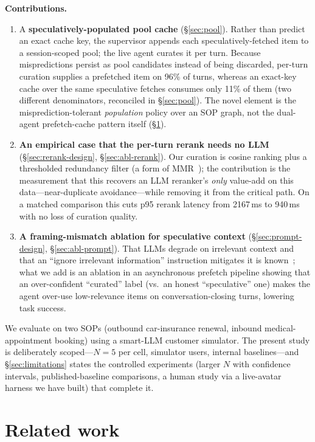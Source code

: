 \documentclass[10pt,twocolumn]{article}
\begin{document}
\textbf{Contributions.}
\begin{enumerate}[leftmargin=*, itemsep=3pt]
\item A \textbf{speculatively-populated pool cache} (\S\ref{sec:pool}). Rather than predict an exact cache key, the supervisor appends each speculatively-fetched item to a session-scoped pool; the live agent curates it per turn. Because mispredictions persist as pool candidates instead of being discarded, per-turn curation supplies a prefetched item on 96\% of turns, whereas an exact-key cache over the same speculative fetches consumes only 11\% of them (two different denominators, reconciled in \S\ref{sec:pool}). The novel element is the misprediction-tolerant \emph{population} policy over an SOP graph, not the dual-agent prefetch-cache pattern itself (\S\ref{sec:related}).
\item \textbf{An empirical case that the per-turn rerank needs no LLM} (\S\ref{sec:rerank-design}, \S\ref{sec:abl-rerank}). Our curation is cosine ranking plus a thresholded redundancy filter (a form of MMR~\cite{mmr1998}); the contribution is the measurement that this recovers an LLM reranker's \emph{only} value-add on this data---near-duplicate avoidance---while removing it from the critical path. On a matched comparison this cuts p95 rerank latency from 2167\,ms to 940\,ms with no loss of curation quality.
\item \textbf{A framing-mismatch ablation for speculative context} (\S\ref{sec:prompt-design}, \S\ref{sec:abl-prompt}). That LLMs degrade on irrelevant context and that an ``ignore irrelevant information'' instruction mitigates it is known~\cite{shi2023}; what we add is an ablation in an asynchronous prefetch pipeline showing that an over-confident ``curated'' label (vs.\ an honest ``speculative'' one) makes the agent over-use low-relevance items on conversation-closing turns, lowering task success.
\end{enumerate}

We evaluate on two SOPs (outbound car-insurance renewal, inbound medical-appointment booking) using a smart-LLM customer simulator. The present study is deliberately scoped---$N{=}5$ per cell, simulator users, internal baselines---and \S\ref{sec:limitations} states the controlled experiments (larger $N$ with confidence intervals, published-baseline comparisons, a human study via a live-avatar harness we have built) that complete it.

\section{Related work}
\label{sec:related}
\end{document}
